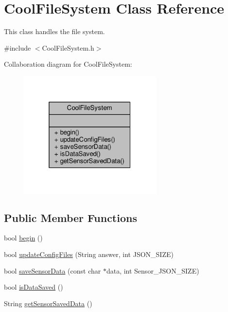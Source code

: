 \hypertarget{class_cool_file_system}{}\section{Cool\+File\+System Class Reference}
\label{class_cool_file_system}


This class handles the file system.  




{\ttfamily \#include $<$Cool\+File\+System.\+h$>$}



Collaboration diagram for Cool\+File\+System\+:
\nopagebreak
\begin{figure}[H]
\begin{center}
\leavevmode
\includegraphics[width=205pt]{class_cool_file_system__coll__graph}
\end{center}
\end{figure}
\subsection*{Public Member Functions}
\begin{DoxyCompactItemize}
\item 
bool \hyperlink{class_cool_file_system_a6ba6f666ed4c530174f8569d2c636748}{begin} ()
\item 
bool \hyperlink{class_cool_file_system_a32dad79ae80182a83e2e8f52286b7c7b}{update\+Config\+Files} (String answer, int J\+S\+O\+N\+\_\+\+S\+I\+ZE)
\item 
bool \hyperlink{class_cool_file_system_a4c560c2ddd40b74b7758e6ceb2c58957}{save\+Sensor\+Data} (const char $\ast$data, int Sensor\+\_\+\+J\+S\+O\+N\+\_\+\+S\+I\+ZE)
\item 
bool \hyperlink{class_cool_file_system_a5a7eaeea7a9fbf8aaef651d862fa3b5b}{is\+Data\+Saved} ()
\item 
String \hyperlink{class_cool_file_system_a5c58bca3735c0ed3efb268d70ef998ef}{get\+Sensor\+Saved\+Data} ()
\end{DoxyCompactItemize}


